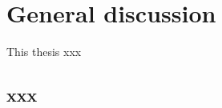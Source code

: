 \chapter[General discussion]{General discussion}

\cleardoublepage

This thesis xxx

\section{xxx}

\clearpage

\renewcommand{\bibname}{Reference}


\clearpage
\thispagestyle{empty}
~
\cleardoublepage